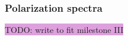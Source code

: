 \documentclass{aa}
\numberwithin{equation}{section}
\numberwithin{table}{section}
\numberwithin{figure}{section}
\begin{document}




\subsubsection{Polarization spectra}\label{subsubsec: IV theory polarization}
\colorbox{Plum}{TODO: write to fit milestone III}

\end{document}
